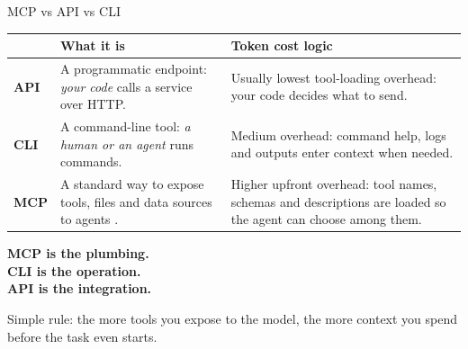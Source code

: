 \begin{frame}{MCP vs API vs CLI}
  \vspace{0.1cm}
  \begin{center}
  \begin{tabularx}{0.94\linewidth}{>{\bfseries\color{deepblue}}lXX}
  \toprule
   & What it is & Token cost logic\\
  \midrule
  API & A programmatic endpoint: \emph{your code} calls a service over HTTP. & Usually lowest tool-loading overhead: your code decides what to send.\\
  CLI & A command-line tool: \emph{a human or an agent} runs commands. & Medium overhead: command help, logs and outputs enter context when needed.\\
  MCP & A standard way to expose tools, files and data sources to agents \citep{anthropic_mcp_2024}. & Higher upfront overhead: tool names, schemas and descriptions are loaded so the agent can choose among them.\\
  \bottomrule
  \end{tabularx}
  \end{center}
  \vspace{0.25cm}
  \begin{center}\Large\color{accent}\bfseries MCP is the plumbing.\\CLI is the operation.\\API is the integration.\end{center}
  \vspace{0.15cm}
  \begin{center}\scriptsize\color{muted}Simple rule: the more tools you expose to the model, the more context you spend before the task even starts.\end{center}
\end{frame}

